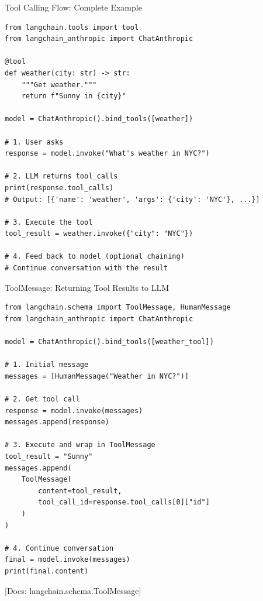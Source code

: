 \documentclass[aspectratio=169,11pt]{beamer}
\newcommand{\docref}[1]{{\scriptsize\color{docgray}[Docs: #1]}}
\begin{document}
\begin{frame}[fragile]{Tool Calling Flow: Complete Example}
\begin{codebox}
\begin{lstlisting}
from langchain.tools import tool
from langchain_anthropic import ChatAnthropic

@tool
def weather(city: str) -> str:
    """Get weather."""
    return f"Sunny in {city}"

model = ChatAnthropic().bind_tools([weather])

# 1. User asks
response = model.invoke("What's weather in NYC?")

# 2. LLM returns tool_calls
print(response.tool_calls)
# Output: [{'name': 'weather', 'args': {'city': 'NYC'}, ...}]

# 3. Execute the tool
tool_result = weather.invoke({"city": "NYC"})

# 4. Feed back to model (optional chaining)
# Continue conversation with the result
\end{lstlisting}
\end{codebox}
\end{frame}

\begin{frame}[fragile,shrink=3]{ToolMessage: Returning Tool Results to LLM}
\begin{codebox}
\begin{lstlisting}
from langchain.schema import ToolMessage, HumanMessage
from langchain_anthropic import ChatAnthropic

model = ChatAnthropic().bind_tools([weather_tool])

# 1. Initial message
messages = [HumanMessage("Weather in NYC?")]

# 2. Get tool call
response = model.invoke(messages)
messages.append(response)

# 3. Execute and wrap in ToolMessage
tool_result = "Sunny"
messages.append(
    ToolMessage(
        content=tool_result,
        tool_call_id=response.tool_calls[0]["id"]
    )
)

# 4. Continue conversation
final = model.invoke(messages)
print(final.content)
\end{lstlisting}
\end{codebox}

\textcolor{docgray}{\docref{langchain.schema.ToolMessage}}
\end{frame}
\end{document}
